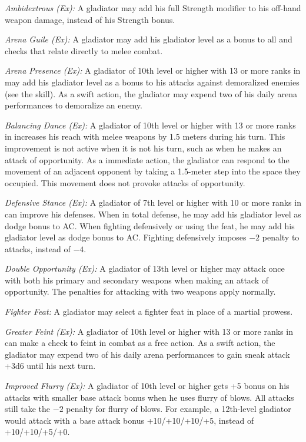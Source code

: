 \textit{Ambidextrous (Ex):} A gladiator may add his full Strength modifier to his off-hand weapon damage, instead of \onehalf his Strength bonus.

\textit{Arena Guile (Ex):} A gladiator may add \onehalf his gladiator level as a bonus to all  and  checks that relate directly to melee combat.

\textit{Arena Presence (Ex):} A gladiator of 10th level or higher with 13 or more ranks in  may add \onequarter his gladiator level as a bonus to his attacks against demoralized enemies (see the  skill). As a swift action, the gladiator may expend two of his daily arena performances to demoralize an enemy.

\textit{Balancing Dance (Ex):} A gladiator of 10th level or higher with 13 or more ranks in  increases his reach with melee weapons by 1.5 meters during his turn. This improvement is not active when it is not his turn, such as when he makes an attack of opportunity. As a immediate action, the gladiator can respond to the movement of an adjacent opponent by taking a 1.5-meter step into the space they occupied. This movement does not provoke attacks of opportunity.

\textit{Defensive Stance (Ex):} A gladiator of 7th level or higher with 10 or more ranks in  can improve his defenses. When in total defense, he may add \onehalf his gladiator level as dodge bonus to AC. When fighting defensively or using the  feat, he may add \onequarter his gladiator level as dodge bonus to AC. Fighting defensively imposes $-2$ penalty to attacks, instead of $-4$.

\textit{Double Opportunity (Ex):} A gladiator of 13th level or higher may attack once with both his primary and secondary weapons when making an attack of opportunity. The penalties for attacking with two weapons apply normally.

\textit{Fighter Feat:} A gladiator may select a fighter feat in place of a martial prowess.

\textit{Greater Feint (Ex):} A gladiator of 10th level or higher with 13 or more ranks in  can make a  check to feint in combat as a free action. As a swift action, the gladiator may expend two of his daily arena performances to gain sneak attack +3d6 until his next turn.

\textit{Improved Flurry (Ex):} A gladiator of 10th level or higher gets +5 bonus on his attacks with smaller base attack bonus when he uses flurry of blows. All attacks still take the $-2$ penalty for flurry of blows. For example, a 12th-level gladiator would attack with a base attack bonus +10/+10/+10/+5, instead of +10/+10/+5/+0.

